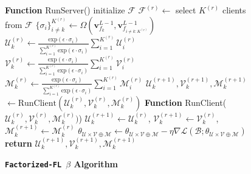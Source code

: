 \begin{figure*}[h!]
\begin{minipage}[t]{.5\linewidth}
\begin{algorithm}[H]
\begin{algorithmic}[1]
        	\end{algorithmic}
    	\end{algorithm}
    \end{minipage}
    \begin{minipage}[t]{.5\linewidth}
        \begin{algorithm}[H]
        \small
        \label{algo:factorized_fl_beta}
    	\caption{\textbf{\texttt{Factorized-FL $\beta$} Algorithm}}
    	    \begin{algorithmic}[1]
    	        \label{algo:factorized_fl_beta}
                \STATE   \textbf{Function} RunServer()
                    \STATE initialize $\mathcal{F} $
                        \STATE $\mathcal{F}^{(r)} \leftarrow$ select $K^{(r)}$ clients from $\mathcal{F}$
                                \STATE $\{\sigma_i \}_{i \neq k}^{K^{(r)}} \leftarrow \Omega(\textbf{v}_{f_k}^{L-1}, \textbf{v}_{f_{i\neq k:K^{(r)}}}^{L-1})$
                                \STATE $\mathcal{U}_{k}^{(r)} \leftarrow \frac{\text{exp}({\epsilon \cdot \sigma_i})}{\sum_{i=1}^{K^{(r)}} \text{exp}(\epsilon \cdot \sigma_i)} \sum_{i=1}^{K^{(r)}} \mathcal{U}_i^{(r)}$
                                \STATE $\mathcal{V}_{k}^{(r)} \leftarrow \frac{\text{exp}({\epsilon \cdot \sigma_i})}{\sum_{i=1}^{K^{(r)}} \text{exp}(\epsilon \cdot \sigma_i)} \sum_{i=1}^{K^{(r)}} \mathcal{V}_i^{(r)}$
                                \STATE $\mathcal{M}_{k}^{(r)} \leftarrow \frac{\text{exp}({\epsilon \cdot \sigma_i})}{\sum_{i=1}^{K^{(r)}} \text{exp}(\epsilon \cdot \sigma_i)} \sum_{i=1}^{K^{(r)}} \mathcal{M}_i^{(r)}$
                            \ENDIF 
                            \STATE $\mathcal{U}_k^{(r+1)},  \mathcal{V}_k^{(r+1)}, \mathcal{M}_k^{(r+1)}$
                            \STATE \hspace{7em} $\leftarrow \text{RunClient} (\mathcal{U}_{k}^{(r)}, \mathcal{V}_{k}^{(r)}, \mathcal{M}_{k}^{(r)})$
                    	\ENDFOR
                    \ENDFOR 
                \STATE   \textbf{Function} RunClient($\mathcal{U}^{(r)}_k, \mathcal{V}_{k}^{(r)}, \mathcal{M}_{k}^{(r)})$)
                    \STATE $\mathcal{U}_{k}^{(r+1)} \leftarrow \mathcal{U}^{(r)}_k$, $\mathcal{V}_{k}^{(r+1)} \leftarrow \mathcal{V}^{(r)}_k$, $\mathcal{M}_{k}^{(r+1)} \leftarrow \mathcal{M}^{(r)}_k$  
                            \STATE $\theta_{\mathcal{U} \times \mathcal{V} \oplus \mathcal{M}} \leftarrow \theta_{\mathcal{U} \times \mathcal{V} \oplus \mathcal{M}}-\eta\nabla\mathcal{L}(\mathcal{B}; \theta_{\mathcal{U} \times \mathcal{V} \oplus \mathcal{M}})$
                        \ENDFOR
                    \ENDFOR
                    \STATE \textbf{return} $\mathcal{U}_{k}^{(r+1)},\mathcal{V}_{k}^{(r+1)},\mathcal{M}_{k}^{(r+1)}$
                    

\end{algorithmic}
\end{algorithm}
\end{minipage}
\end{figure*}
